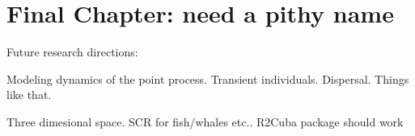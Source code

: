 


\chapter{Final Chapter: need a pithy name}
\label{chapt.final}

\vspace{0.3cm}


Future research directions:

 Modeling dynamics of the point process. Transient individuals. Dispersal. Things like that.


Three dimesional space. SCR for fish/whales etc.. R2Cuba package
should work







